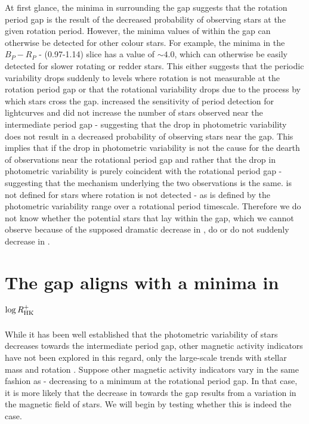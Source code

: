 At first glance, the minima in \rper{} surrounding the gap suggests that the rotation period gap is the result of the decreased probability of observing stars at the given rotation period.
However, the minima values of \rper{} within the gap can otherwise be detected for other colour stars.
For example, the minima in the $B_P-R_P$ - (0.97-1.14) slice has a \rper{} value of $\sim 4.0$, which can otherwise be easily detected for slower rotating or redder stars.
This either suggests that the periodic variability drops suddenly to levels where rotation is not measurable at the rotation period gap or that the rotational variability drops due to the process by which stars cross the gap. 
 \citet{santos_surface_2021} increased the sensitivity of period detection for \kepler{} lightcurves and did not increase the number of stars observed near the intermediate period gap - suggesting that the drop in photometric variability does not result in a decreased probability of observing stars near the gap.
This implies that if the drop in photometric variability is not the cause for the dearth of observations near the rotational period gap and rather that the drop in photometric variability is purely coincident with the rotational period gap - suggesting that the mechanism underlying the two observations is the same.
\rper{} is not defined for stars where rotation is not detected - as \rper{} is defined by the photometric variability range over a rotational period timescale.
Therefore we do not know whether the potential stars that lay within the gap, which we cannot observe because of the supposed dramatic decrease in \rper{}, do or do not suddenly decrease in \rper{}.

\section{The gap aligns with a minima in $\log R^{+}_{\rm{HK}}$ }
\label{sec:minima_rhk}

While it has been well established that the photometric variability of stars decreases towards the intermediate period gap, other magnetic activity indicators have not been explored in this regard, only the large-scale trends with stellar mass and rotation \citep{zhang_magnetic_2020}.
Suppose other magnetic activity indicators vary in the same fashion as \rper{} - decreasing to a minimum at the rotational period gap. 
In that case, it is more likely that the decrease in \rper{} towards the gap results from a variation in the magnetic field of stars.
We will begin by testing whether this is indeed the case.

